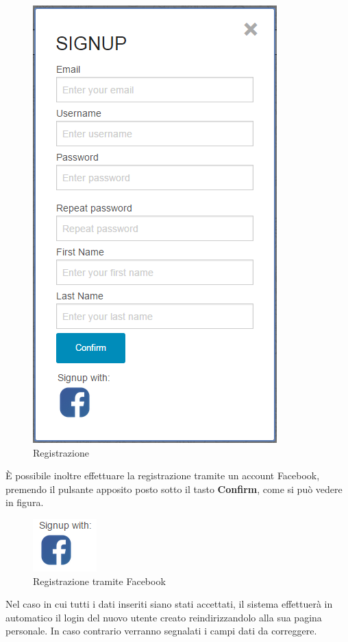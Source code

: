 \begin{figure}[H] 
	\centering 
	\includegraphics[scale=0.40] {img/signup.png}
	\caption{Registrazione} 
\end{figure}

\noindent È possibile inoltre effettuare la registrazione tramite un account Facebook, premendo il pulsante apposito posto sotto il tasto \textbf{Confirm}, come si può vedere in figura.

\begin{figure}[H] 
	\centering 
	\includegraphics[scale=0.40] {img/facereg.png}
	\caption{Registrazione tramite Facebook} 
\end{figure}

\noindent Nel caso in cui tutti i dati inseriti siano stati accettati, il sistema effettuerà in automatico il login del nuovo utente creato reindirizzandolo alla sua pagina personale.
In caso contrario verranno segnalati i campi dati da correggere.

